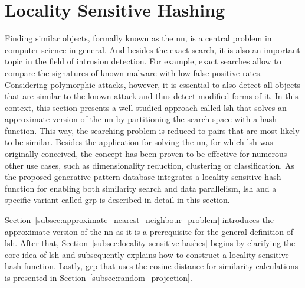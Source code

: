 \documentclass[../../../main.tex]{subfiles}
\begin{document}
\section{Locality Sensitive Hashing}
Finding similar objects, formally known as the \gls{nn}, is a central problem in computer science in general. And besides the exact search, it is also an important topic in the field of intrusion detection. For example, exact searches allow to compare the signatures of known malware with low false positive rates. Considering polymorphic attacks, however, it is essential to also detect all objects that are similar to the known attack and thus detect modified forms of it. In this context, this section presents a well-studied approach called \gls{lsh} that solves an approximate version of the \gls{nn} by partitioning the search space with a hash function. This way, the searching problem is reduced to pairs that are most likely to be similar. Besides the application for solving the \gls{nn}, for which \gls{lsh} was originally conceived, the concept has been proven to be effective for numerous other use cases, such as dimensionality reduction, clustering or classification. As the proposed generative pattern database integrates a locality-sensitive hash function for enabling both similarity search and data parallelism, \gls{lsh} and a specific variant called \gls{grp} is described in detail in this section.

Section~\ref{subsec:approximate_nearest_neighbour_problem} introduces the approximate version of the \gls{nn} as it is a prerequisite for the general definition of \gls{lsh}. After that, Section~\ref{subsec:locality-sensitive-hashes} begins by clarifying the core idea of \gls{lsh} and subsequently explains how to construct a locality-sensitive hash function. Lastly, \gls{grp} that uses the cosine distance for similarity calculations is presented in Section~\ref{subsec:random_projection}.






\end{document}
